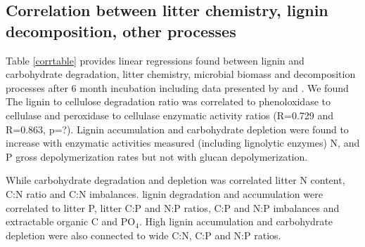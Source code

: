 \documentclass[authoryear,preprint,review,12pt]{elsarticle}
\begin{document}


\subsection{Correlation between litter chemistry, lignin decomposition, other processes}

Table \ref{corrtable} provides linear regressions found between lignin and carbohydrate degradation, litter chemistry, microbial biomass and decomposition processes after 6 month incubation including data presented by \cite{Mooshammer2011} and \cite{Leitner2011}. We found  The lignin to cellulose degradation ratio was correlated to phenoloxidase to cellulase and peroxidase to cellulase enzymatic activity ratios (R=0.729 and R=0.863, p=?). Lignin accumulation and carbohydrate depletion were found to increase with enzymatic activities measured (including lignolytic enzymes) N, and P gross depolymerization rates but not with glucan depolymerization.

While carbohydrate degradation and depletion was correlated litter N content, C:N ratio and C:N imbalances. lignin degradation and accumulation were correlated to litter P, litter C:P and N:P ratios, C:P and N:P imbalances and extractable organic C and PO$_4$. High lignin accumulation and carbohydrate depletion were also connected to wide C:N, C:P and N:P ratios.
\end{document}
